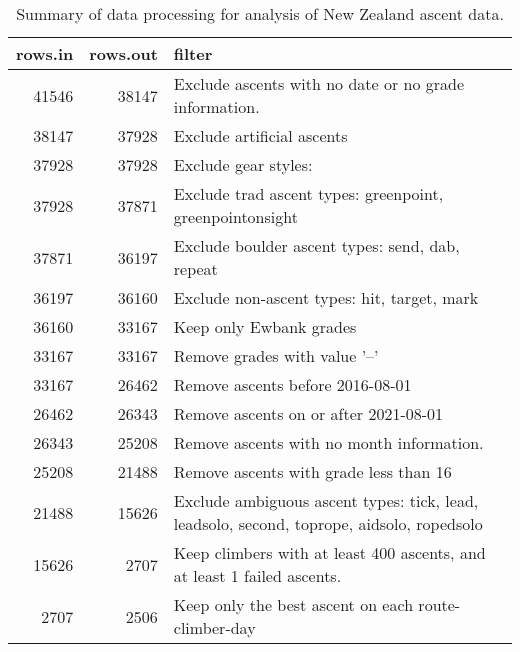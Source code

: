 \begin{table}[ht]
\centering
\begingroup\fontsize{9pt}{10pt}\selectfont
\begin{tabular}{rrl}
  \hline
{\bf rows.in} & {\bf rows.out} & {\bf filter} \\ 
  \hline
41546 & 38147 & Exclude ascents with no date or no grade information. \\ 
  38147 & 37928 & Exclude artificial ascents \\ 
  37928 & 37928 & Exclude gear styles:  \\ 
  37928 & 37871 & Exclude trad ascent types: greenpoint, greenpointonsight \\ 
  37871 & 36197 & Exclude boulder ascent types: send, dab, repeat \\ 
  36197 & 36160 & Exclude non-ascent types: hit, target, mark \\ 
  36160 & 33167 & Keep only Ewbank grades \\ 
  33167 & 33167 & Remove grades with value '--' \\ 
  33167 & 26462 & Remove ascents before 2016-08-01 \\ 
  26462 & 26343 & Remove ascents on or after 2021-08-01 \\ 
  26343 & 25208 & Remove ascents with no month information. \\ 
  25208 & 21488 & Remove ascents with grade less than 16 \\ 
  21488 & 15626 & Exclude ambiguous ascent types: tick, lead, leadsolo, second, toprope, aidsolo, ropedsolo \\ 
  15626 & 2707 & Keep climbers with at least 400 ascents, and at least 1 failed ascents. \\ 
  2707 & 2506 & Keep only the best ascent on each route-climber-day \\ 
   \hline
\end{tabular}
\endgroup
\caption{Summary of data processing for analysis of New Zealand ascent data.} 
\label{table-data-processing-nz}
\end{table}
